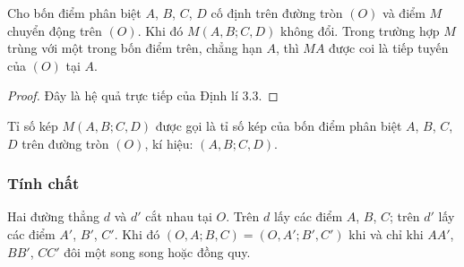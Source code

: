 \documentclass{article} %
\begin{document}
        \begin{theorem}
            Cho bốn điểm phân biệt \(A\), \(B\), \(C\), \(D\) cố định trên đường tròn \((O)\) và điểm \(M\) chuyển động trên \((O)\). Khi đó \(M(A,B;C,D)\) không đổi. Trong trường hợp \(M\) trùng với một trong bốn điểm trên, chẳng hạn \(A\), thì \(MA\) được coi là tiếp tuyến của \((O)\) tại \(A\).
        \end{theorem}

        \begin{proof}
            Đây là hệ quả trực tiếp của Định lí 3.3.
        \end{proof}

        \begin{definition}
            Tỉ số kép \(M(A,B;C,D)\) được gọi là tỉ số kép của bốn điểm phân biệt \(A\), \(B\), \(C\), \(D\) trên đường tròn \((O)\), kí hiệu: \((A,B;C,D)\).
        \end{definition}

    \subsubsection*{Tính chất}

        \begin{property}
            Hai đường thẳng \(d\) và \(d'\) cắt nhau tại \(O\). Trên \(d\) lấy các điểm \(A\), \(B\), \(C\); trên \(d'\) lấy các điểm \(A'\), \(B'\), \(C'\). Khi đó \((O,A;B,C) = (O,A';B',C')\) khi và chỉ khi \(AA'\), \(BB'\), \(CC'\) đôi một song song hoặc đồng quy.
        \end{property}
\end{document}
